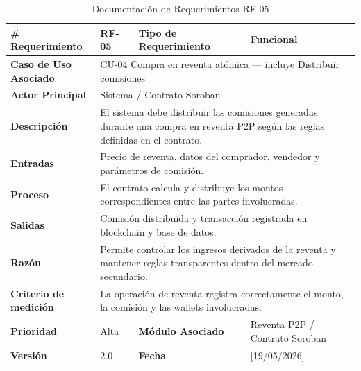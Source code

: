 \documentclass[12pt,letterpaper]{article}
\begin{document}
\begin{table}[H]
\centering
\scriptsize
\renewcommand{\arraystretch}{1.05}
\setlength{\tabcolsep}{3pt}

\newlength{\anchoceldaRFcinco}
\setlength{\anchoceldaRFcinco}{\dimexpr\textwidth-2.7cm-8\tabcolsep-5\arrayrulewidth\relax}

\begin{tabularx}{\textwidth}{|p{2.7cm}|X|p{2.8cm}|X|}
\hline
\textbf{\# Requerimiento} & RF-05 & \textbf{Tipo de Requerimiento} & Funcional \\ \hline

\textbf{Caso de Uso Asociado} & 
\multicolumn{3}{p{\anchoceldaRFcinco}|}{CU-04 Compra en reventa atómica --- incluye Distribuir comisiones} \\ \hline

\textbf{Actor Principal} & 
\multicolumn{3}{p{\anchoceldaRFcinco}|}{Sistema / Contrato Soroban} \\ \hline

\textbf{Descripción} & 
\multicolumn{3}{p{\anchoceldaRFcinco}|}{El sistema debe distribuir las comisiones generadas durante una compra en reventa P2P según las reglas definidas en el contrato.} \\ \hline

\textbf{Entradas} & 
\multicolumn{3}{p{\anchoceldaRFcinco}|}{Precio de reventa, datos del comprador, vendedor y parámetros de comisión.} \\ \hline

\textbf{Proceso} & 
\multicolumn{3}{p{\anchoceldaRFcinco}|}{El contrato calcula y distribuye los montos correspondientes entre las partes involucradas.} \\ \hline

\textbf{Salidas} & 
\multicolumn{3}{p{\anchoceldaRFcinco}|}{Comisión distribuida y transacción registrada en blockchain y base de datos.} \\ \hline

\textbf{Razón} & 
\multicolumn{3}{p{\anchoceldaRFcinco}|}{Permite controlar los ingresos derivados de la reventa y mantener reglas transparentes dentro del mercado secundario.} \\ \hline

\textbf{Criterio de medición} & 
\multicolumn{3}{p{\anchoceldaRFcinco}|}{La operación de reventa registra correctamente el monto, la comisión y las wallets involucradas.} \\ \hline

\textbf{Prioridad} & Alta & \textbf{Módulo Asociado} & Reventa P2P / Contrato Soroban \\ \hline

\textbf{Versión} & 2.0 & \textbf{Fecha} & [19/05/2026] \\ \hline

\end{tabularx}

\caption{Documentación de Requerimientos RF-05}
\label{tab:documentacion_requerimientos_rf05}
\normalsize
\end{table}
\end{document}
